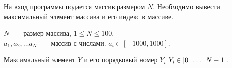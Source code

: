 На вход программы подается массив размером $N$. Необходимо вывести максимальный элемент массива и его индекс в массиве.

\InputFile

\noindent
$N$~---~размер массива, $1 \leq N \leq 100$. \\
$a_1, a_2, \ldots a_N$~---~массив с числами. $ a_i \in [-1000, 1000]$. 

\OutputFile

Максимальный элемент $Y$ и его порядковый номер $Y_i$
$Y_i \in [0 \enskip \ldots \enskip N - 1]$.

\SAMPLES

